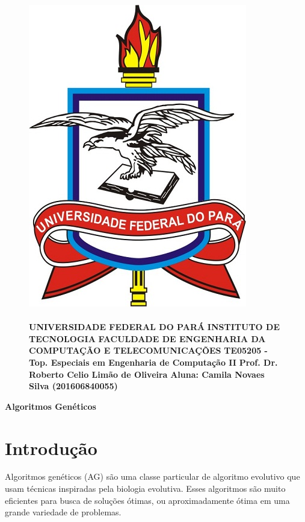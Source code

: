 \documentclass[12pt]{article}
\title{}
\date{}
\begin{document}
\begin{figure}
		\begin{minipage}{.3\linewidth}
			\centering
			\includegraphics[width=.6\linewidth]{imgs/ufpa.jpg}
		\end{minipage}
		\begin{minipage}{.70\linewidth}
			\flushleft
			\paragraph{}
			\textbf{ }\newline
			\textbf{UNIVERSIDADE FEDERAL DO PARÁ} \newline
			\textbf{INSTITUTO DE TECNOLOGIA} \newline
			\textbf{FACULDADE DE ENGENHARIA DA COMPUTAÇÃO E TELECOMUNICAÇÕES} \newline
			\textbf{TE05205 - Top. Especiais em Engenharia de Computação II} \newline
            \textbf{Prof. Dr. Roberto Celio Limão de Oliveira} \newline
            \textbf{Aluna: Camila Novaes Silva (201606840055)}
		\end{minipage}
\end{figure}
\FloatBarrier
\begin{center}
    {\Large \textbf{Algoritmos Genéticos}}
\end{center}

\section{Introdução}
Algoritmos genéticos (AG) são uma classe particular de algoritmo evolutivo que usam técnicas
inspiradas pela biologia evolutiva. Esses algoritmos são muito eficientes para busca de
soluções ótimas, ou aproximadamente ótima em uma grande variedade de problemas.
\end{document}
